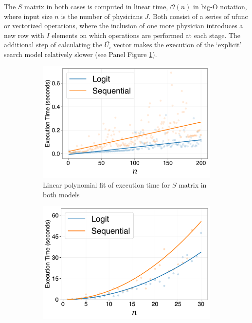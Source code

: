 \documentclass[../main.tex]{subfiles}
\begin{document}
The $S$ matrix in both cases is computed in linear time, $\mathcal{O}(n)$ in big-O notation, where input size $n$ is the number of physicians $J$. Both consist of a series of ufunc or vectorized operations, where the inclusion of one more physician introduces a new row with $I$ elements on which operations are performed at each stage. The additional step of calculating the $\bar{U_i}$ vector makes the execution of the `explicit' search model relatively slower (see Panel Figure \ref{fig:subfig1}).

\begin{figure}[H]
    \centering
    \begin{subfigure}[b]{0.45\linewidth}
        \centering
        \includegraphics[width=\linewidth]{linear.pdf}
        \vspace{-0.6cm}
        \caption{Linear polynomial fit of execution time for $S$ matrix in both models}
        \label{fig:subfig1}
    \end{subfigure}
    \hspace{0.05\linewidth}  %
    \begin{subfigure}[b]{0.45\linewidth}
        \centering
        \includegraphics[width=\linewidth]{squared.pdf}

\end{subfigure}
\end{figure}
\end{document}
